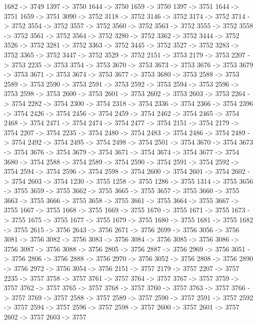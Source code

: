 {	1682 -> 3749
	1397 -> 3750
	1644 -> 3750
	1659 -> 3750
	1397 -> 3751
	1644 -> 3751
	1659 -> 3751
	3090 -> 3752
	3118 -> 3752
	3146 -> 3752
	3174 -> 3752
	3714 -> 3752
	3554 -> 3752
	3557 -> 3752
	3560 -> 3752
	3563 -> 3752
	3555 -> 3752
	3558 -> 3752
	3561 -> 3752
	3564 -> 3752
	3280 -> 3752
	3362 -> 3752
	3444 -> 3752
	3526 -> 3752
	3281 -> 3752
	3363 -> 3752
	3445 -> 3752
	3527 -> 3752
	3283 -> 3752
	3365 -> 3752
	3447 -> 3752
	3529 -> 3752
	2151 -> 3753
	2179 -> 3753
	2207 -> 3753
	2235 -> 3753
	3754 -> 3753
	3670 -> 3753
	3673 -> 3753
	3676 -> 3753
	3679 -> 3753
	3671 -> 3753
	3674 -> 3753
	3677 -> 3753
	3680 -> 3753
	2588 -> 3753
	2589 -> 3753
	2590 -> 3753
	2591 -> 3753
	2592 -> 3753
	2594 -> 3753
	2596 -> 3753
	2598 -> 3753
	2600 -> 3753
	2601 -> 3753
	2602 -> 3753
	2603 -> 3753
	2264 -> 3754
	2282 -> 3754
	2300 -> 3754
	2318 -> 3754
	2336 -> 3754
	2366 -> 3754
	2396 -> 3754
	2426 -> 3754
	2456 -> 3754
	2459 -> 3754
	2462 -> 3754
	2465 -> 3754
	2468 -> 3754
	2471 -> 3754
	2474 -> 3754
	2477 -> 3754
	2151 -> 3754
	2179 -> 3754
	2207 -> 3754
	2235 -> 3754
	2480 -> 3754
	2483 -> 3754
	2486 -> 3754
	2489 -> 3754
	2492 -> 3754
	2495 -> 3754
	2498 -> 3754
	2501 -> 3754
	3670 -> 3754
	3673 -> 3754
	3676 -> 3754
	3679 -> 3754
	3671 -> 3754
	3674 -> 3754
	3677 -> 3754
	3680 -> 3754
	2588 -> 3754
	2589 -> 3754
	2590 -> 3754
	2591 -> 3754
	2592 -> 3754
	2594 -> 3754
	2596 -> 3754
	2598 -> 3754
	2600 -> 3754
	2601 -> 3754
	2602 -> 3754
	2603 -> 3754
	1230 -> 3755
	1258 -> 3755
	1286 -> 3755
	1314 -> 3755
	3656 -> 3755
	3659 -> 3755
	3662 -> 3755
	3665 -> 3755
	3657 -> 3755
	3660 -> 3755
	3663 -> 3755
	3666 -> 3755
	3658 -> 3755
	3661 -> 3755
	3664 -> 3755
	3667 -> 3755
	1667 -> 3755
	1668 -> 3755
	1669 -> 3755
	1670 -> 3755
	1671 -> 3755
	1673 -> 3755
	1675 -> 3755
	1677 -> 3755
	1679 -> 3755
	1680 -> 3755
	1681 -> 3755
	1682 -> 3755
	2615 -> 3756
	2643 -> 3756
	2671 -> 3756
	2699 -> 3756
	3056 -> 3756
	3081 -> 3756
	3082 -> 3756
	3083 -> 3756
	3084 -> 3756
	3085 -> 3756
	3086 -> 3756
	3087 -> 3756
	3088 -> 3756
	2805 -> 3756
	2887 -> 3756
	2969 -> 3756
	3051 -> 3756
	2806 -> 3756
	2888 -> 3756
	2970 -> 3756
	3052 -> 3756
	2808 -> 3756
	2890 -> 3756
	2972 -> 3756
	3054 -> 3756
	2151 -> 3757
	2179 -> 3757
	2207 -> 3757
	2235 -> 3757
	3758 -> 3757
	3761 -> 3757
	3764 -> 3757
	3767 -> 3757
	3759 -> 3757
	3762 -> 3757
	3765 -> 3757
	3768 -> 3757
	3760 -> 3757
	3763 -> 3757
	3766 -> 3757
	3769 -> 3757
	2588 -> 3757
	2589 -> 3757
	2590 -> 3757
	2591 -> 3757
	2592 -> 3757
	2594 -> 3757
	2596 -> 3757
	2598 -> 3757
	2600 -> 3757
	2601 -> 3757
	2602 -> 3757
	2603 -> 3757
}
